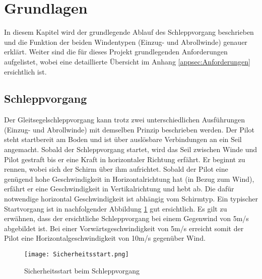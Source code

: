 \section{Grundlagen}\label{sec:Grundlagen}
In diesem Kapitel wird der grundlegende Ablauf des Schleppvorgang beschrieben und die Funktion der beiden Windentypen (Einzug- und Abrollwinde) genauer erklärt. Weiter sind die für dieses Projekt grundlegenden Anforderungen aufgelistet, wobei eine detaillierte Übersicht im Anhang \ref{appsec:Anforderungen} ersichtlich ist.



\subsection{Schleppvorgang}\label{subsec:Schleppvorgang}
Der Gleitsegelschleppvorgang kann trotz zwei unterschiedlichen Ausführungen (Einzug- und Abrollwinde) mit demselben Prinzip beschrieben werden. Der Pilot steht startbereit am Boden und ist über auslösbare Verbindungen an ein Seil angemacht. Sobald der Schleppvorgang startet, wird das Seil zwischen Winde und Pilot gestraft bis er eine Kraft in horizontaler Richtung erfährt. Er beginnt zu rennen, wobei sich der Schirm über ihm aufrichtet. Sobald der Pilot eine genügend hohe Geschwindigkeit in Horizontalrichtung hat (in Bezug zum Wind), erfährt er eine Geschwindigkeit in Vertikalrichtung und hebt ab. Die dafür notwendige horizontal Geschwindigkeit ist abhängig vom Schirmtyp. Ein typischer Startvorgang ist in nachfolgender Abbildung \ref{fig:Sicherheitsstart} gut ersichtlich. Es gilt zu erwähnen, dass der ersichtliche Schleppvorgang bei einem Gegenwind von 5m/s abgebildet ist. Bei einer Vorwärtsgeschwindigkeit von 5m/s erreicht somit der Pilot eine Horizontalgeschwindigkeit von 10m/s gegenüber Wind.

\begin{figure}[H]
	\begin{center}
		\texttt{[image: Sicherheitsstart.png]}
		\caption{Sicherheitsstart beim Schleppvorgang \cite{Gleitsegelschlepp}}
		\label{fig:Sicherheitsstart}
	\end{center}
\end{figure}

